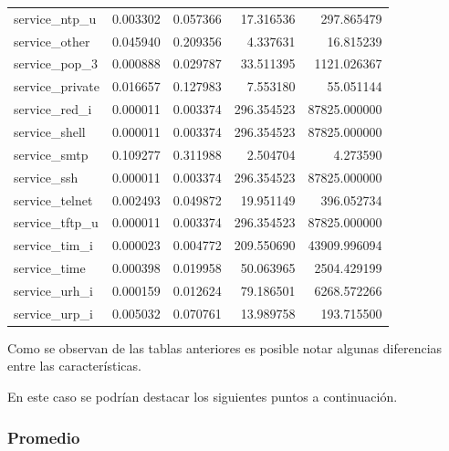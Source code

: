 \documentclass[12pt,a4paper]{article}
\begin{document}
\begin{longtable}{lrrrr}
  service_ntp_u & 0.003302 & 0.057366 & 17.316536 & 297.865479 \\
  service_other & 0.045940 & 0.209356 & 4.337631 & 16.815239 \\
  service_pop_3 & 0.000888 & 0.029787 & 33.511395 & 1121.026367 \\
  service_private & 0.016657 & 0.127983 & 7.553180 & 55.051144 \\
  service_red_i & 0.000011 & 0.003374 & 296.354523 & 87825.000000 \\
  service_shell & 0.000011 & 0.003374 & 296.354523 & 87825.000000 \\
  service_smtp & 0.109277 & 0.311988 & 2.504704 & 4.273590 \\
  service_ssh & 0.000011 & 0.003374 & 296.354523 & 87825.000000 \\
  service_telnet & 0.002493 & 0.049872 & 19.951149 & 396.052734 \\
  service_tftp_u & 0.000011 & 0.003374 & 296.354523 & 87825.000000 \\
  service_tim_i & 0.000023 & 0.004772 & 209.550690 & 43909.996094 \\
  service_time & 0.000398 & 0.019958 & 50.063965 & 2504.429199 \\
  service_urh_i & 0.000159 & 0.012624 & 79.186501 & 6268.572266 \\
  service_urp_i & 0.005032 & 0.070761 & 13.989758 & 193.715500 \\
\end{longtable}

Como se observan de las tablas anteriores es posible notar algunas diferencias entre las características.

En este caso se podrían destacar los siguientes puntos a continuación.

\subsubsection{Promedio}
\end{document}

